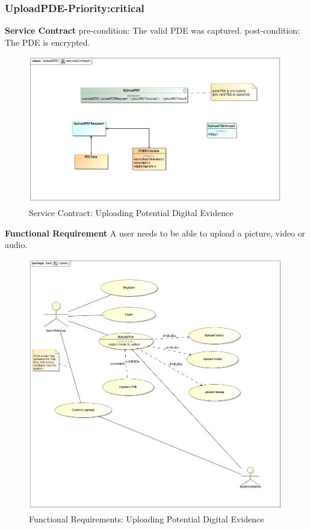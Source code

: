 \documentclass[a4paper,12pt]{article}
\begin{document}
\subsubsection{UploadPDE-Priority:critical}
\textbf{Service Contract}\newline
pre-condition: The valid PDE was captured.\newline
post-condition: The PDE is encrypted.\newline
\begin{figure}[H]
\includegraphics[width=\textwidth]{images/UploadserviceContract.jpg}
\caption{Service Contract: Uploading Potential Digital Evidence \label{overflow}}
\end{figure}\newpage
\textbf{Functional Requirement}\newline
A user needs to be able to upload a picture, video or audio.\newline
\begin{figure}[H]	
\includegraphics[width=\textwidth]{images/upload.jpg}
\caption{Functional Requirements: Uploading Potential Digital Evidence \label{overflow}}
\end{figure}
\end{document}
